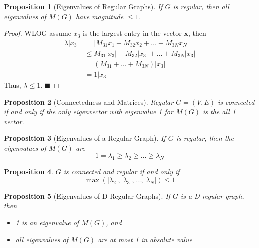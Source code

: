 \documentclass[11pt, letter]{book}
\newcommand{\bx}{\mathbf{x}}
\newcommand{\qed}{\hfill $\blacksquare$}
\newtheorem{proposition}{Proposition}[chapter]
\begin{document}
\begin{proposition}[Eigenvalues of Regular Graphs]
	If $G$ is regular, then all eigenvalues of $M(G)$ have magnitude $\leq 1$. 
\end{proposition}

\begin{proof}
	WLOG assume $x_3$ is the largest entry in the vector $\bx$, then
	\begin{align}
		\lambda |x_3| 
		&= |M_{31}x_1 + M_{32}x_2 + ... + M_{3N}x_N| \\
		&\leq M_{31}|x_3| + M_{32}|x_3| + ... + M_{3N} |x_3| \\
		&= (M_{31} + \ldots + M_{3N}) |x_3| \\
		&= 1 |x_3|
	\end{align}
	Thus, $\lambda \leq 1$. \qed
\end{proof}

\begin{proposition}[Connectedness and Matrices]
	Regular $G = (V, E)$ is connected if and only if the only eigenvector with eigenvalue 1 for $M(G)$ is the all 1 vector. 
\end{proposition}

\begin{proposition}[Eigenvalues of a Regular Graph]
	If $G$ is regular, then the eigenvalues of $M(G)$ are 
	\begin{equation}
		1 = \lambda_1 \geq \lambda_2 \geq \dots \geq \lambda_N
	\end{equation}
\end{proposition}

\begin{proposition}
	$G$ is connected and regular if and only if 
	\begin{equation}
		\max ( |\lambda_2| , |\lambda_3|, \dots, |\lambda_N|) \leq 1
	\end{equation}
\end{proposition}

\begin{proposition}[Eigenvalues of D-Regular Graphs]
	If $G$ is a D-regular graph, then
	\begin{itemize}
		\item 1 is an eigenvalue of $M(G)$, and 
		\item all eigenvalues of $M(G)$ are at most 1 in absolute value
	\end{itemize}
\end{proposition}
\end{document}
